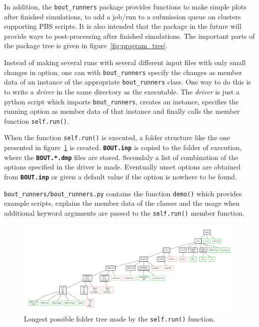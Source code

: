 \documentclass[12pt]{article}
\newcommand{\file}[1]{\texttt{\bf #1}}
\begin{document}
In addition, the \lstinline!bout_runners! package provides functions to make 
simple plots after finished simulations, to add a job/run to a submission queue 
on clusters supporting PBS scripts. It is also intended that the package in the 
future will provide ways to post-processing after finished simulations. The 
important parts of the package tree is given in figure~\ref{fig:program_tree}.


Instead of making several runs with several different input files with only
small changes in option, one can with \lstinline!bout_runners! specify the 
changes as member data of an instance of the appropriate 
\lstinline!bout_runners! class. One way to do this is to write a \emph{driver} 
in the same directory as the executable. The \emph{driver} is just a 
python script which imports
\lstinline!bout_runners!, creates an instance, specifies the 
running option as member data of that instance and finally calls the 
member function \lstinline!self.run()!.

When the function \lstinline!self.run()! is executed, a folder structure like 
the one presented in figure~\ref{fig:folder_tree} is created. 
\file{BOUT.inp} is copied to the folder of execution, where the 
\file{BOUT.*.dmp} files are stored. Secondaly a list of combination of the 
options specified in the driver is made. Eventually unset options are obtained 
from \file{BOUT.inp} or given a default value if the option is nowhere to be 
found.

\lstinline!bout_runners/bout_runners.py! contains the function 
\lstinline!demo()! which provides example scripts, explains the member data of 
the classes and the usage when additional keyword arguments are passed to the 
\lstinline!self.run()! member function.

\begin{landscape}
\thispagestyle{empty}
 \vspace*{2cm}
 \begin{figure}[htbp!]
 \hspace*{-4cm}
\centering
\includegraphics[width=1.35\hsize]{figs/folder_tree.pdf}
\caption{Longest possible folder tree made by the \lstinline!self.run()! 
function.}
\label{fig:folder_tree}
\end{figure}
\end{landscape}
\end{document}
